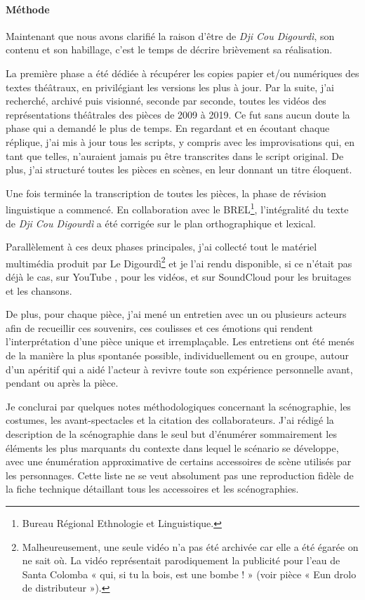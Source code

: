 \paragraph*{Méthode}
Maintenant que nous avons clarifié la raison d'être de \textit{Dji Cou Digourdì}, son contenu et son habillage, c'est le temps de décrire brièvement sa réalisation.

La première phase a été dédiée à récupérer les copies papier et/ou numériques des textes théâtraux, en privilégiant les versions les plus à jour. Par la suite, j'ai recherché, archivé puis visionné, seconde par seconde, toutes les vidéos des représentations théâtrales des pièces de 2009 à 2019. Ce fut sans aucun doute la phase qui a demandé le plus de temps. En regardant et en écoutant chaque réplique, j'ai mis à jour tous les scripts, y compris avec les improvisations qui, en tant que telles, n'auraient jamais pu être transcrites dans le script original. De plus, j'ai structuré toutes les pièces en scènes, en leur donnant un titre éloquent.

Une fois terminée la transcription de toutes les pièces, la phase de révision linguistique a commencé. En collaboration avec le BREL\footnote{ Bureau Régional Ethnologie et Linguistique.}, l'intégralité du texte de \textit{Dji Cou Digourdì} a été corrigée sur le plan orthographique et lexical.

Parallèlement à ces deux phases principales, j'ai collecté tout le matériel multimédia produit par Le Digourdì\footnote{ Malheureusement, une seule vidéo n'a pas été archivée car elle a été égarée on ne sait où. La vidéo représentait parodiquement la publicité pour l'eau de Santa Colomba « qui, si tu la bois, est une bombe ! » (voir pièce « Eun drolo de distributeur »).} et je l'ai rendu disponible, si ce n'était pas déjà le cas, sur YouTube \href{https://www.youtube.com/@the_digourdi}{\yt}, pour les vidéos, et sur SoundCloud \href{https://soundcloud.com/user-234168361/sets}{\pppp} pour les bruitages et les chansons.

De plus, pour chaque pièce, j'ai mené un entretien avec un ou plusieurs acteurs afin de recueillir ces souvenirs, ces coulisses et ces émotions qui rendent l'interprétation d'une pièce unique et irremplaçable. Les entretiens ont été menés de la manière la plus spontanée possible, individuellement ou en groupe, autour d'un apéritif qui a aidé l'acteur à revivre toute son expérience personnelle avant, pendant ou après la pièce.

Je conclurai par quelques notes méthodologiques concernant la scénographie, les costumes, les avant-spectacles et la citation des collaborateurs.
J'ai rédigé la description de la scénographie dans le seul but d'énumérer sommairement les éléments les plus marquants du contexte dans lequel le scénario se développe, avec une énumération approximative de certains accessoires de scène utilisés par les personnages. Cette liste ne se veut absolument pas une reproduction fidèle de la fiche technique détaillant tous les accessoires et les scénographies.

